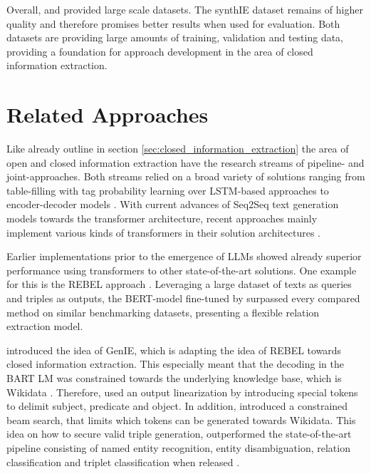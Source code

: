 \documentclass[a4paper,oneside,bibliography=totoc]{scrbook}
\begin{document}
Overall, \citet{HuguetCabot2021} and \cite{Josifoski2023} provided large scale datasets. The synthIE dataset remains of higher quality and therefore promises better results when used for evaluation. Both datasets are providing large amounts of training, validation and testing data, providing a foundation for approach development in the area of closed information extraction.

\section{Related Approaches}
\label{sec:related_approaches}

Like already outline in section \ref{sec:closed_information_extraction} the area of open and closed information extraction have the research streams of pipeline- and joint-approaches. Both streams relied on a broad variety of solutions ranging from table-filling with tag probability learning over LSTM-based approaches to encoder-decoder models \cite{Zhang2022,Angeli2015,Trisedya2019}. With current advances of Seq2Seq text generation models towards the transformer architecture, recent approaches mainly implement various kinds of transformers in their solution architectures \cite{Josifoski2021,Josifoski2023,Moeller2024}.

Earlier implementations prior to the emergence of \acp{LLM} showed already superior performance using transformers to other state-of-the-art solutions. One example for this is the REBEL approach \cite{HuguetCabot2021}. Leveraging a large dataset of texts as queries and triples as outputs, the BERT-model fine-tuned by \citet{HuguetCabot2021} surpassed every compared method on similar benchmarking datasets, presenting a flexible relation extraction model.

\citet{Josifoski2021} introduced the idea of GenIE, which is adapting the idea of REBEL towards closed information extraction. This especially meant that the decoding in the BART \ac{LM} was constrained towards the underlying knowledge base, which is Wikidata \cite{Josifoski2021}. Therefore, \citet{Josifoski2021} used an output linearization by introducing special tokens to delimit subject, predicate and object. In addition, \cite{Josifoski2021} introduced a constrained beam search, that limits which tokens can be generated towards Wikidata. This idea on how to secure valid triple generation, outperformed the state-of-the-art pipeline consisting of named entity recognition, entity disambiguation, relation classification and triplet classification when released \cite{Josifoski2021}.
\end{document}

